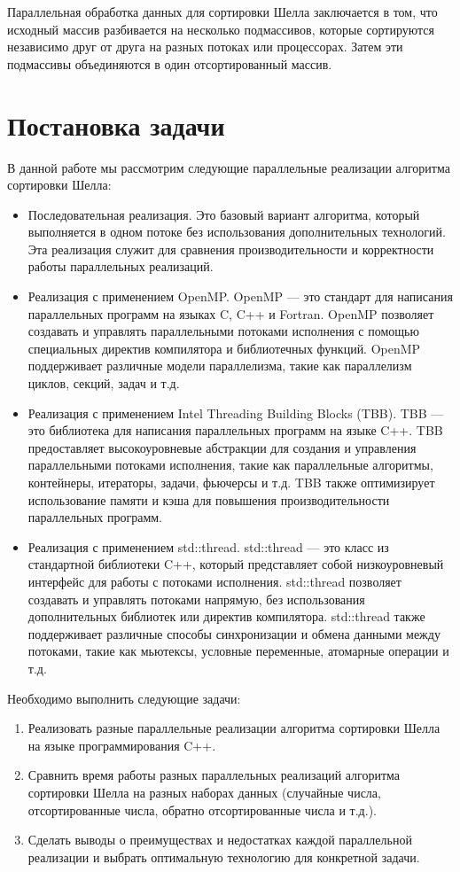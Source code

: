 \documentclass{article}
\begin{document}
Параллельная обработка данных для сортировки Шелла заключается в том, что исходный массив разбивается на несколько подмассивов, которые сортируются независимо друг от друга на разных потоках или процессорах. Затем эти подмассивы объединяются в один отсортированный массив.

\newpage
\section{Постановка задачи}
В данной работе мы рассмотрим следующие параллельные реализации алгоритма сортировки Шелла:

\begin{itemize} \item Последовательная реализация. Это базовый вариант алгоритма, который выполняется в одном потоке без использования дополнительных технологий. Эта реализация служит для сравнения производительности и корректности работы параллельных реализаций. \item Реализация с применением OpenMP. OpenMP — это стандарт для написания параллельных программ на языках C, C++ и Fortran. OpenMP позволяет создавать и управлять параллельными потоками исполнения с помощью специальных директив компилятора и библиотечных функций. OpenMP поддерживает различные модели параллелизма, такие как параллелизм циклов, секций, задач и т.д. \item Реализация с применением Intel Threading Building Blocks (TBB). TBB — это библиотека для написания параллельных программ на языке C++. TBB предоставляет высокоуровневые абстракции для создания и управления параллельными потоками исполнения, такие как параллельные алгоритмы, контейнеры, итераторы, задачи, фьючерсы и т.д. TBB также оптимизирует использование памяти и кэша для повышения производительности параллельных программ. \item Реализация с применением std::thread. std::thread — это класс из стандартной библиотеки C++, который представляет собой низкоуровневый интерфейс для работы с потоками исполнения. std::thread позволяет создавать и управлять потоками напрямую, без использования дополнительных библиотек или директив компилятора. std::thread также поддерживает различные способы синхронизации и обмена данными между потоками, такие как мьютексы, условные переменные, атомарные операции и т.д. \end{itemize}
Необходимо выполнить следующие задачи:
\begin{enumerate} \item Реализовать разные параллельные реализации алгоритма сортировки Шелла на языке программирования C++. \item Сравнить время работы разных параллельных реализаций алгоритма сортировки Шелла на разных наборах данных (случайные числа, отсортированные числа, обратно отсортированные числа и т.д.). \item Сделать выводы о преимуществах и недостатках каждой параллельной реализации и выбрать оптимальную технологию для конкретной задачи. \end{enumerate}
\end{document}
